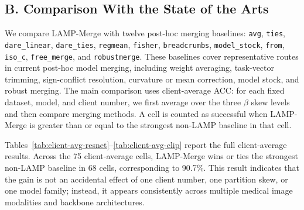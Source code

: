 \documentclass[letterpaper]{article} %
\begin{document}
\subsection{B. Comparison With the State of the Arts}
We compare LAMP-Merge with twelve post-hoc merging baselines: \texttt{avg}, \texttt{ties}, \texttt{dare\_linear}, \texttt{dare\_ties}, \texttt{regmean}, \texttt{fisher}, \texttt{breadcrumbs}, \texttt{model\_stock}, \texttt{from}, \texttt{iso\_c}, \texttt{free\_merge}, and \texttt{robustmerge}. These baselines cover representative routes in current post-hoc model merging, including weight averaging, task-vector trimming, sign-conflict resolution, curvature or mean correction, model stock, and robust merging. The main comparison uses client-average ACC: for each fixed dataset, model, and client number, we first average over the three $\beta$ skew levels and then compare merging methods. A cell is counted as successful when LAMP-Merge is greater than or equal to the strongest non-LAMP baseline in that cell.

Tables~\ref{tab:client-avg-resnet}--\ref{tab:client-avg-clip} report the full client-average results. Across the 75 client-average cells, LAMP-Merge wins or ties the strongest non-LAMP baseline in 68 cells, corresponding to 90.7\%. This result indicates that the gain is not an accidental effect of one client number, one partition skew, or one model family; instead, it appears consistently across multiple medical image modalities and backbone architectures.
\end{document}
